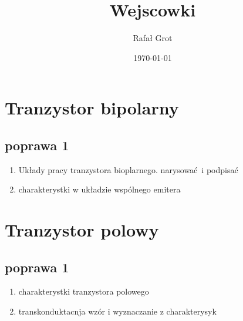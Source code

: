 \documentclass[11pt]{article}
\author{Rafał Grot}
\date{\today}
\title{Wejscowki}
\begin{document}
\maketitle
\tableofcontents

\section{Tranzystor bipolarny}
\label{sec:org8563ed5}
\subsection{poprawa 1}
\label{sec:orgb7d5e0e}
\begin{enumerate}
\item Układy pracy tranzystora bioplarnego. narysować i podpisać
\item charakterystki w układzie wspólnego emitera
\end{enumerate}
\section{Tranzystor polowy}
\label{sec:org609d191}
\subsection{poprawa 1}
\label{sec:orgd8b6470}
\begin{enumerate}
\item charakterystki tranzystora polowego
\item transkonduktacnja wzór i wyznaczanie z charakterysyk
\end{enumerate}
\end{document}
